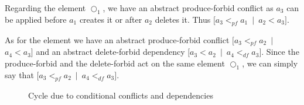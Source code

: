 \begin{example}
  Regarding the element $\Circle_1$, we have an abstract produce-forbid conflict as $a_3$ can be applied before $a_1$ creates it or after $a_2$ deletes it. Thus \mbox{$[a_3 <_{pf} a_1$ $|$ $a_2 < a_3]$}.

  As for the element we have an abstract produce-forbid conflict \mbox{$[a_3 <_{pf} a_2$ $|$ $a_4 < a_3]$} and an abstract delete-forbid dependency \mbox{$[a_3 < a_2$ $|$ $a_4 <_{df} a_3]$}. Since the produce-forbid and the delete-forbid act on the same element $\Circle_1$, we can simply say that \mbox{$[a_3 <_{pf} a_2$ $|$ $a_4 <_{df} a_3]$}.

\begin{figure}[!ht]
  \centering
  \caption{Cycle due to conditional conflicts and dependencies}\label{fig:process:order:cycle}
\end{figure}
\end{example}

